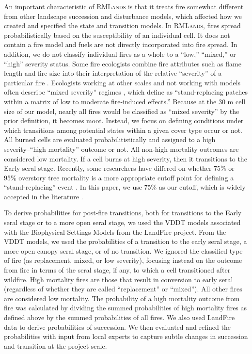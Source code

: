 An important characteristic of \textsc{RMLands} is that it treats fire somewhat different from other landscape succession and disturbance models, which affected how we created and specified the state and transition models. In \textsc{RMLands}, fires spread probabilistically based on the susceptibility of an individual cell. It does not contain a fire model and fuels are not directly incorporated into fire spread. In addition, we do not classify individual fires as a whole to a ``low,'' ``mixed,'' or ``high'' severity status. Some fire ecologists combine fire attributes such as flame length and fire size into their interpretation of the relative ``severity'' of a particular fire \citep{Agee1993}.   Ecologists working at other scales and not working with models often describe ``mixed severity'' regimes \citep[e.g.,][]{Kane2013}, which \citet{Collins2010} define as ``stand-replacing patches within a matrix of low to moderate fire-induced effects.'' Because at the 30 m cell size of our model, nearly all fires would be classified as ``mixed severity'' by the prior definition, it becomes moot. Instead, we focus on defining conditions under which transitions among potential states within a given cover type occur or not. All burned cells are evaluated probabilitistically and assigned to a high severity--``high mortality'' outcome or not. All non-high mortality outcomes are considered low mortality. If a cell burns at high severity, then it transitions to the Early seral stage. Recently, some researchers have differed on whether 75\% or 95\% overstory tree mortality is a more appropriate cutoff point for defining a ``stand-replacing'' event \citep{Fule2014,Mallek2013}. In this paper, we use 75\% as our cutoff, which is widely accepted in the literature \citep{Miller2009,Baker2014,Agee2007,Agee1993}. 

To derive probabilities for post-fire transitions, both for transitions to the Early seral stage or to a more open seral stage, we used the VDDT models associated with the Biophysical Settings Models from the LandFire project. From the VDDT models, we used the probabilities of a transition to the early seral stage, a more open canopy seral stage, or of no transition. We ignored the classified type of fire (as replacement, mixed, or low severity), focusing instead on the outcome from fire in terms of the seral stage, if any, to which a cell transitioned after wildfire. High mortality fires are those that result in conversion to early seral (regardless of whether they are called ``replacement'' or ``mixed''). All other fires are considered low mortality. The probability of a high mortality outcome from fire was calculated by dividing the summed probabilities of high mortality fires as defined above by the summed probabilities of all fires.  We also used LandFire data to derive probabilities of succession. We then evaluated and refined the probabilities with input from local experts to capture subtle changes in succession and transition at the project scale.



